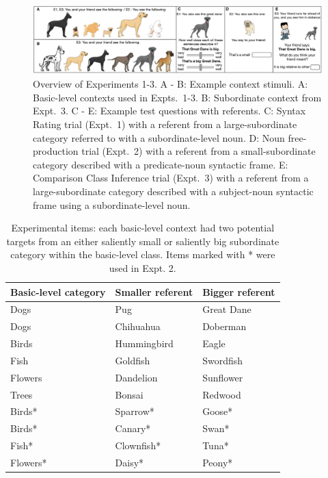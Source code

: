 \documentclass[10pt,letterpaper]{article}
\begin{document}
\begin{figure}[t]
\begin{center}
\includegraphics[width=\textwidth]{screenshots.pdf}
\end{center}
\caption{Overview of Experiments 1-3. A - B: Example context stimuli. A: Basic-level contexts used in Expts.~1-3. B: Subordinate context from Expt.~3. C - E: Example test questions with referents. C: Syntax Rating trial (Expt.~1) with a referent from a large-subordinate category referred to with a subordinate-level noun. D: Noun free-production trial (Expt.~2) with a referent from a small-subordinate category described with a predicate-noun syntactic frame. E: Comparison Class Inference trial (Expt.~3) with a referent from a large-subordinate category described with a subject-noun syntactic frame using a subordinate-level noun.} 
\label{screenshots}
\end{figure}
\begin{table}[t]
\small{
\begin{center}
\caption{Experimental items: each basic-level context had two potential targets from an either saliently small or saliently big subordinate category within the basic-level class. Items marked with * were used in Expt. 2.}
\label{tab:stimuli}
\vskip 0.12in
\fontsize{10}{11}\selectfont
\begin{tabularx}{\linewidth}{lll}
\hline
 Basic-level category & Smaller referent & Bigger referent\\
\hline
 Dogs & Pug & Great Dane \\
 Dogs & Chihuahua & Doberman\\
 Birds & Hummingbird & Eagle  \\
 Fish & Goldfish & Swordfish \\
 Flowers & Dandelion & Sunflower\\
 Trees & Bonsai & Redwood\\
Birds* & Sparrow* & Goose* \\
Birds* & Canary* & Swan* \\
Fish* & Clownfish* & Tuna* \\
Flowers* & Daisy* & Peony* \\
\hline     
\end{tabularx}
\end{center}
}
\end{table}
\end{document}

